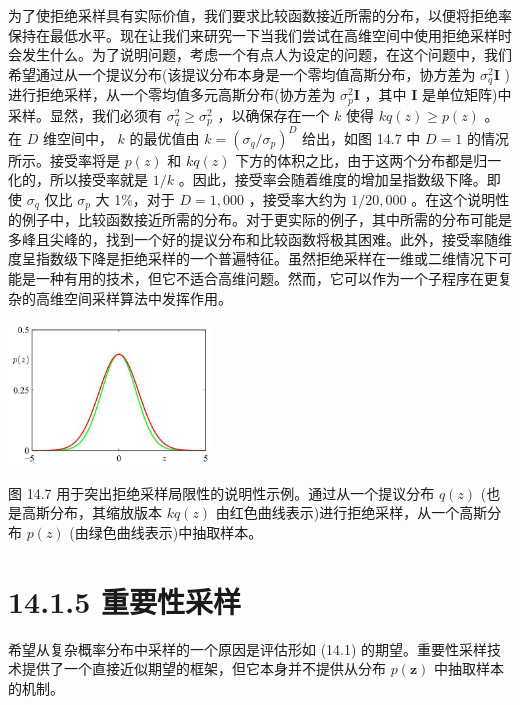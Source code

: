 \documentclass[10pt]{article}
\begin{document}
为了使拒绝采样具有实际价值，我们要求比较函数接近所需的分布，以便将拒绝率保持在最低水平。现在让我们来研究一下当我们尝试在高维空间中使用拒绝采样时会发生什么。为了说明问题，考虑一个有点人为设定的问题，在这个问题中，我们希望通过从一个提议分布(该提议分布本身是一个零均值高斯分布，协方差为 \({\sigma }_{q}^{2}\mathbf{I}\) )进行拒绝采样，从一个零均值多元高斯分布(协方差为 \({\sigma }_{p}^{2}\mathbf{I}\) ，其中 \(\mathbf{I}\) 是单位矩阵)中采样。显然，我们必须有 \({\sigma }_{q}^{2} \geq  {\sigma }_{p}^{2}\) ，以确保存在一个 \(k\) 使得 \({kq}\left( z\right)  \geq  p\left( z\right)\) 。在 \(D\) 维空间中， \(k\) 的最优值由 \(k = {\left( {\sigma }_{q}/{\sigma }_{p}\right) }^{D}\) 给出，如图 14.7 中 \(D = 1\) 的情况所示。接受率将是 \(p\left( z\right)\) 和 \({kq}\left( z\right)\) 下方的体积之比，由于这两个分布都是归一化的，所以接受率就是 \(1/k\) 。因此，接受率会随着维度的增加呈指数级下降。即使 \({\sigma }_{q}\) 仅比 \({\sigma }_{p}\) 大 1\%，对于 \(D = 1,{000}\) ，接受率大约为 \(1/{20},{000}\) 。在这个说明性的例子中，比较函数接近所需的分布。对于更实际的例子，其中所需的分布可能是多峰且尖峰的，找到一个好的提议分布和比较函数将极其困难。此外，接受率随维度呈指数级下降是拒绝采样的一个普遍特征。虽然拒绝采样在一维或二维情况下可能是一种有用的技术，但它不适合高维问题。然而，它可以作为一个子程序在更复杂的高维空间采样算法中发挥作用。

\begin{center}
\includegraphics[max width=0.4\textwidth]{images/0194e279-9b28-703a-88f4-c3ac21e2010d_455_921_1510_613_435_0.jpg}
\end{center}
\hspace*{3em} 

图 14.7 用于突出拒绝采样局限性的说明性示例。通过从一个提议分布 \(q\left( z\right)\) (也是高斯分布，其缩放版本 \({kq}\left( z\right)\) 由红色曲线表示)进行拒绝采样，从一个高斯分布 \(p\left( z\right)\) (由绿色曲线表示)中抽取样本。

\section*{14.1.5 重要性采样}

希望从复杂概率分布中采样的一个原因是评估形如 (14.1) 的期望。重要性采样技术提供了一个直接近似期望的框架，但它本身并不提供从分布 \(p\left( \mathbf{z}\right)\) 中抽取样本的机制。
\end{document}
